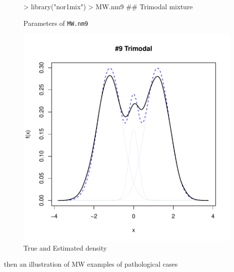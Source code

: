 \begin{figure}[h]
    \centering
    \begin{minipage}{0.45\textwidth}
\begin{Schunk}
\begin{Sinput}
>     library("nor1mix")
>     MW.nm9 ## Trimodal mixture
\end{Sinput}
\end{Schunk}
        \caption{Parameters of {\tt MW.nm9}}
        \label{tab:MW.nm9}
    \end{minipage}
    \begin{minipage}{0.45\textwidth}
\includegraphics{chapter1-003}
        \caption{True and Estimated density}
        \label{fig:MW.nm9}
    \end{minipage}
\end{figure}

then an illustration of MW examples of pathological cases




